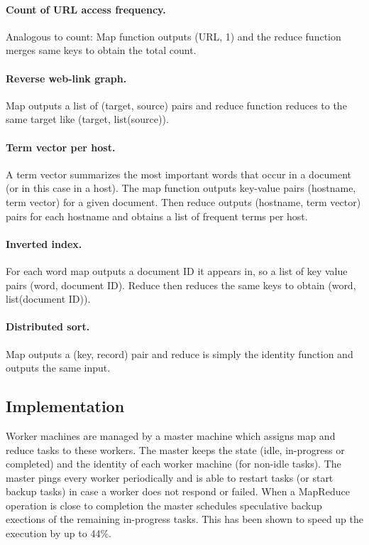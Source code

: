\paragraph{Count of URL access frequency.}
Analogous to count: Map function outputs (URL, 1) and the reduce function merges same keys to obtain the total count.

\paragraph{Reverse web-link graph.}
Map outputs a list of (target, source) pairs and reduce function reduces to the same target like (target, list(source)).

\paragraph{Term vector per host.}
A term vector summarizes the most important words that occur in a document (or in this case in a host). The map function outputs key-value pairs (hostname, term vector) for a given document. Then reduce outputs (hostname, term vector) pairs for each hostname and obtains a list of frequent terms per host.

\paragraph{Inverted index.}
For each word map outputs a document ID it appears in, so a list of key value pairs (word, document ID). Reduce then reduces the same keys to obtain (word, list(document ID)).

\paragraph{Distributed sort.}
Map outputs a (key, record) pair and reduce is simply the identity function and outputs the same input.

\subsection{Implementation}
\bigskip

Worker machines are managed by a master machine which assigns map and reduce tasks to these workers. The master keeps the state (idle, in-progress or completed) and the identity of each worker machine (for non-idle tasks). The master pings every worker periodically and is able to restart tasks (or start backup tasks) in case a worker does not respond or failed. When a MapReduce operation is close to completion the master schedules speculative backup exections of the remaining in-progress tasks. This has been shown to speed up the execution by up to 44\%.

